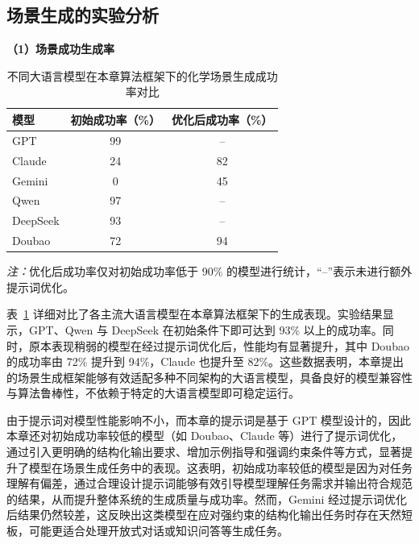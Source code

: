 \subsection{场景生成的实验分析}


\noindent\textbf{（1）场景成功生成率}

\begin{table}[!t]
\centering
\caption{不同大语言模型在本章算法框架下的化学场景生成成功率对比}
\label{tab:prompt_refinement_success_rate}
\small
\setlength{\tabcolsep}{8pt}
\renewcommand{\arraystretch}{1.15}
\begin{tabular}{lcc}
\toprule
\textbf{模型} & \textbf{初始成功率（\%）} & \textbf{优化后成功率（\%）} \\
\midrule
GPT               & 99 & --   \\
Claude            & 24 & 82   \\
Gemini            & 0  & 45   \\
Qwen              & 97 & --   \\
DeepSeek          & 93 & --   \\
Doubao            & 72 & 94   \\
\bottomrule
\end{tabular}

\vspace{0.5em}
\begin{minipage}{0.92\linewidth}
\footnotesize
\textit{注：}优化后成功率仅对初始成功率低于 90\% 的模型进行统计，“--”表示未进行额外提示词优化。
\end{minipage}
\end{table}

表~\ref{tab:prompt_refinement_success_rate} 详细对比了各主流大语言模型在本章算法框架下的生成表现。实验结果显示，GPT、Qwen 与 DeepSeek 在初始条件下即可达到 93\% 以上的成功率。同时，原本表现稍弱的模型在经过提示词优化后，性能均有显著提升，其中 Doubao 的成功率由 72\% 提升到 94\%，Claude 也提升至 82\%。这些数据表明，本章提出的场景生成框架能够有效适配多种不同架构的大语言模型，具备良好的模型兼容性与算法鲁棒性，不依赖于特定的大语言模型即可稳定运行。


由于提示词对模型性能影响不小，而本章的提示词是基于 GPT 模型设计的，因此本章还对初始成功率较低的模型（如 Doubao、Claude 等）进行了提示词优化，通过引入更明确的结构化输出要求、增加示例指导和强调约束条件等方式，显著提升了模型在场景生成任务中的表现。这表明，初始成功率较低的模型是因为对任务理解有偏差，通过合理设计提示词能够有效引导模型理解任务需求并输出符合规范的结果，从而提升整体系统的生成质量与成功率。然而，Gemini 经过提示词优化后结果仍然较差，这反映出这类模型在应对强约束的结构化输出任务时存在天然短板，可能更适合处理开放式对话或知识问答等生成任务。


